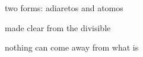 two forms: adiaretos and atomos

made clear from the divisible

nothing can come away from what is

